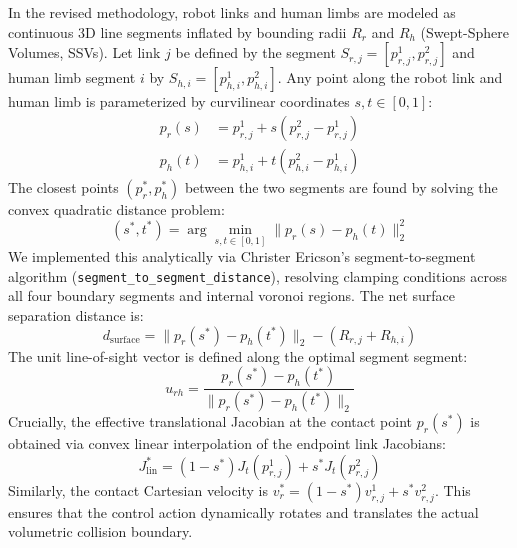 \documentclass[10pt,twocolumn,a4paper]{article}
\begin{document}
In the revised methodology, robot links and human limbs are modeled as continuous 3D line segments inflated by bounding radii $R_r$ and $R_h$ (Swept-Sphere Volumes, SSVs). Let link $j$ be defined by the segment $S_{r,j} = [p_{r,j}^1, p_{r,j}^2]$ and human limb segment $i$ by $S_{h,i} = [p_{h,i}^1, p_{h,i}^2]$. Any point along the robot link and human limb is parameterized by curvilinear coordinates $s, t \in [0, 1]$:
\begin{align}
p_r(s) &= p_{r,j}^1 + s (p_{r,j}^2 - p_{r,j}^1) \\
p_h(t) &= p_{h,i}^1 + t (p_{h,i}^2 - p_{h,i}^1)
\end{align}
The closest points $(p_r^*, p_h^*)$ between the two segments are found by solving the convex quadratic distance problem:
\begin{equation}
(s^*, t^*) = \arg\min_{s, t \in [0, 1]} \|p_r(s) - p_h(t)\|_2^2
\end{equation}
We implemented this analytically via Christer Ericson's segment-to-segment algorithm (\texttt{segment\_to\_segment\_distance}), resolving clamping conditions across all four boundary segments and internal voronoi regions. The net surface separation distance is:
\begin{equation}
d_{\text{surface}} = \|p_r(s^*) - p_h(t^*)\|_2 - (R_{r,j} + R_{h,i})
\end{equation}
The unit line-of-sight vector is defined along the optimal segment segment:
\begin{equation}
u_{rh} = \frac{p_r(s^*) - p_h(t^*)}{\|p_r(s^*) - p_h(t^*)\|_2}
\end{equation}
Crucially, the effective translational Jacobian at the contact point $p_r(s^*)$ is obtained via convex linear interpolation of the endpoint link Jacobians:
\begin{equation}
J_{\text{lin}}^* = (1 - s^*) J_{t}(p_{r,j}^1) + s^* J_{t}(p_{r,j}^2)
\end{equation}
Similarly, the contact Cartesian velocity is $v_r^* = (1 - s^*) v_{r,j}^1 + s^* v_{r,j}^2$. This ensures that the control action dynamically rotates and translates the actual volumetric collision boundary.
\end{document}
